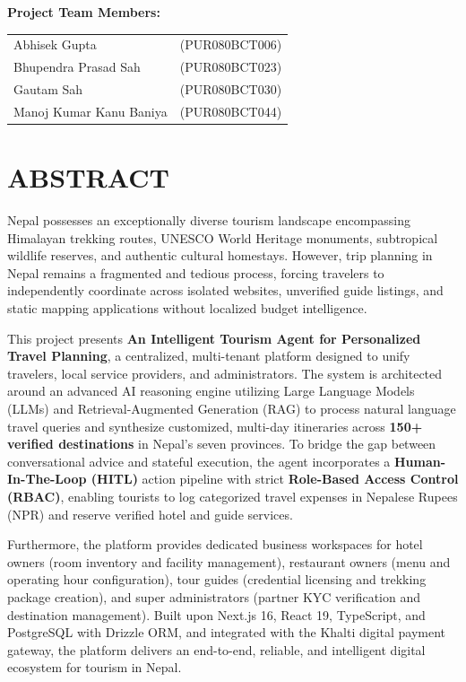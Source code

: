 \documentclass[12pt,a4paper]{report}
\begin{document}
\vspace{1.5cm}
\noindent \textbf{Project Team Members:} \\[0.3cm]
\begin{tabular}{ll}
Abhisek Gupta & (PUR080BCT006) \\
Bhupendra Prasad Sah & (PUR080BCT023) \\
Gautam Sah & (PUR080BCT030) \\
Manoj Kumar Kanu Baniya & (PUR080BCT044) \\
\end{tabular}

\newpage

\chapter*{ABSTRACT}

Nepal possesses an exceptionally diverse tourism landscape encompassing Himalayan trekking routes, UNESCO World Heritage monuments, subtropical wildlife reserves, and authentic cultural homestays. However, trip planning in Nepal remains a fragmented and tedious process, forcing travelers to independently coordinate across isolated websites, unverified guide listings, and static mapping applications without localized budget intelligence.

This project presents \textbf{An Intelligent Tourism Agent for Personalized Travel Planning}, a centralized, multi-tenant platform designed to unify travelers, local service providers, and administrators. The system is architected around an advanced AI reasoning engine utilizing Large Language Models (LLMs) and Retrieval-Augmented Generation (RAG) to process natural language travel queries and synthesize customized, multi-day itineraries across \textbf{150+ verified destinations} in Nepal's seven provinces. To bridge the gap between conversational advice and stateful execution, the agent incorporates a \textbf{Human-In-The-Loop (HITL)} action pipeline with strict \textbf{Role-Based Access Control (RBAC)}, enabling tourists to log categorized travel expenses in Nepalese Rupees (NPR) and reserve verified hotel and guide services.

Furthermore, the platform provides dedicated business workspaces for hotel owners (room inventory and facility management), restaurant owners (menu and operating hour configuration), tour guides (credential licensing and trekking package creation), and super administrators (partner KYC verification and destination management). Built upon Next.js 16, React 19, TypeScript, and PostgreSQL with Drizzle ORM, and integrated with the Khalti digital payment gateway, the platform delivers an end-to-end, reliable, and intelligent digital ecosystem for tourism in Nepal.
\end{document}
